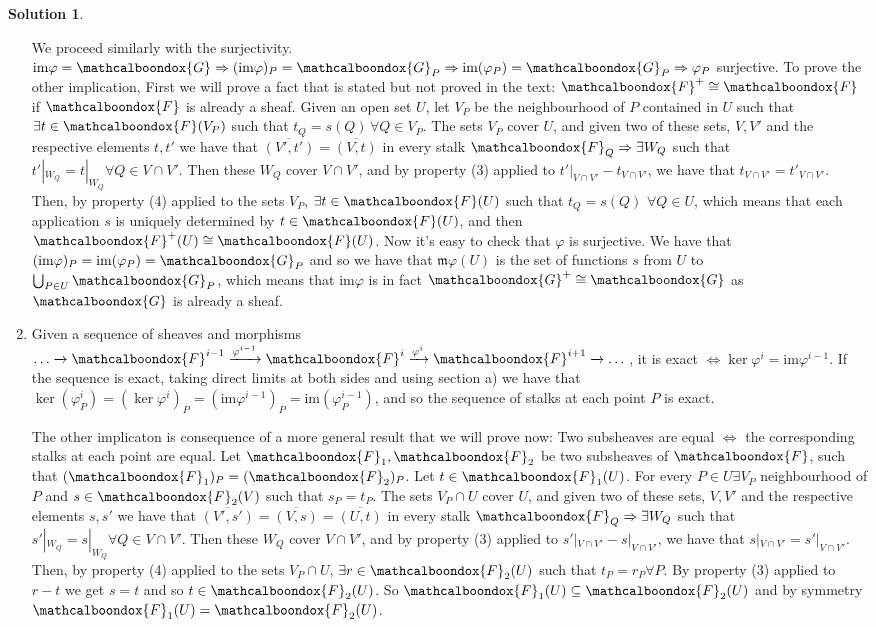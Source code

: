 \documentclass[12pt]{article}
\newcommand{\imp}{\ensuremath{\Rightarrow}}
\newcommand{\im}{\ensuremath{\mathfrak{m}}}
\newcommand{\ima}{\ensuremath{\text{im}}}
\theoremstyle{definition}
\newtheorem*{sol}{Solution}
\newcommand{\sF}{\ensuremath{\mathcalboondox{F}}}
\newcommand{\sG}{\ensuremath{\mathcalboondox{G}}}
\begin{document}
\begin{sol}
\begin{enumerate}[label=\alph*)]
		We proceed similarly with the surjectivity. $\ima \varphi = \sG \imp (\ima \varphi)_P = \sG_P \imp \ima (\varphi_P) = \sG_P \imp \varphi_P$ surjective. To prove the other implication, First we will prove a fact that is stated but not proved in the text: $\sF^{+} \cong \sF$ if $\sF$ is already a sheaf. Given an open set $U$, let $V_P$ be the neighbourhood of $P$ contained in $U$ such that $\exists t \in \sF(V_P)$ such that $t_Q = s(Q) \, \forall Q \in V_P$. The sets $V_P$ cover $U$, and given two of these sets, $V,V'$ and the respective elements $t,t'$ we have that $\overline{(V',t')} = \overline{(V,t)}$ in every stalk $\sF_Q \imp \exists W_Q$ such that $t'|_{W_Q} = t|_{W_Q} \forall Q \in V \cap V'$. Then these $W_Q$ cover $V \cap V'$, and by property (3) applied to $t'|_{V\cap V'}-t_{V\cap V'}$, we have that $t_{V\cap V'} = t'_{V \cap V'}$. Then, by property (4) applied to the sets $V_P$, $\exists t \in \sF(U)$ such that $t_Q = s(Q) \, \, \forall Q \in U$, which means that each application $s$ is uniquely determined by $t \in \sF(U)$, and then $\sF^{+}(U) \cong \sF(U)$. Now it's easy to check that $\varphi$ is surjective. We have that $(\ima \varphi)_P = \ima (\varphi_P) = \sG_P$ and so we have that $\im \varphi (U)$ is the set of functions $s$ from $U$ to $\bigcup_{P \in U} \sG_P$, which means that $\ima \varphi$ is in fact $\sG^{+} \cong \sG$ as $\sG$ is already a sheaf.

		\item Given a sequence of sheaves and morphisms $\dots \xrightarrow[]{} \sF^{i-1} \xrightarrow[]{\varphi^{i-1}} \sF^{i} \xrightarrow[]{\varphi^{i}} \sF^{i+1} \xrightarrow[]{} \dots$, it is exact $\iff \ker \varphi^{i} = \ima \varphi^{i-1}$. If the sequence is exact, taking direct limits at both sides and using section a) we have that $\ker (\varphi^{i}_P) = (\ker \varphi^{i})_P = (\ima \varphi^{i-1})_P = \ima (\varphi^{i-1}_P) $, and so the sequence of stalks at each point $P$ is exact.

		The other implicaton is consequence of a more general result that we will prove now: Two subsheaves are equal $\iff$ the corresponding stalks at each point are equal. Let $\sF_1, \sF_2$ be two subsheaves of $\sF$, such that $(\sF_1)_P = (\sF_2)_P$. Let $t \in \sF_1(U)$. For every $P \in U \exists V_P$ neighbourhood of $P$ and $s \in \sF_2(V)$ such that $s_P = t_P$. The sets $V_P \cap U$ cover $U$, and given two of these sets, $V,V'$ and the respective elements $s,s'$ we have that $\overline{(V',s')} = \overline{(V,s)} = \overline{(U,t)}$ in every stalk $\sF_Q \imp \exists W_Q$ such that $s'|_{W_Q} = s|_{W_Q} \forall Q \in V \cap V'$. Then these $W_Q$ cover $V \cap V'$, and by property (3) applied to $s'|_{V\cap V'}-s|_{V\cap V'}$, we have that $s|_{V\cap V'} = s'|_{V \cap V'}$. Then, by property (4) applied to the sets $V_P \cap U$, $\exists r \in \sF_2(U)$ such that $t_P = r_P \forall P$. By property (3) applied to $r-t$ we get $s = t$ and so $t \in \sF_2(U)$. So $\sF_1(U) \subseteq \sF_2(U)$ and by symmetry $\sF_1(U) = \sF_2(U)$.
	\end{enumerate}
\end{sol}
\end{document}
